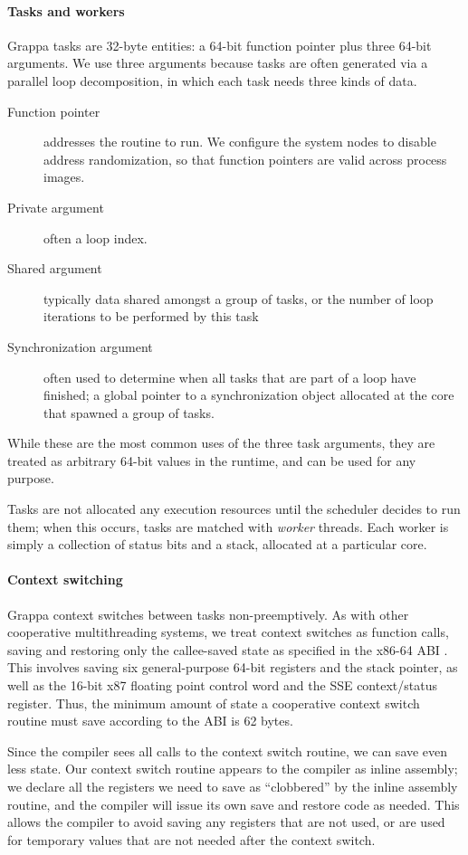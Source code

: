 \paragraph{Tasks and workers} Grappa tasks are 32-byte entities: a
64-bit function pointer plus three 64-bit arguments. We use three
arguments because tasks are often generated via a parallel loop
decomposition, in which each task needs three kinds of data.
\begin{description}
\item[Function pointer] addresses the routine to run. We configure the system nodes to disable address randomization, so that function pointers are valid across process images.
\item[Private argument] often a loop index.
\item[Shared argument] typically data shared amongst a group of tasks, or the number of loop iterations to be performed by this task
\item[Synchronization argument] often used to determine
  when all tasks that are part of a loop have finished; a global pointer to a synchronization object allocated at the core that spawned a group of tasks.
\end{description}
While these are the most common uses of the three task arguments, they
are treated as arbitrary 64-bit values in the runtime, and can be used
for any purpose.

Tasks are not allocated any execution resources until the scheduler
decides to run them; when this occurs, tasks are matched with {\em
  worker} threads. Each worker is simply a collection of status bits and a
stack, allocated at a particular core.

\paragraph{Context switching} Grappa context switches between tasks
non-preemptively. As with other cooperative multithreading systems, we
treat context switches as function calls, saving and restoring only the
callee-saved state as specified in the x86-64 ABI \cite{amd64:abi:2012}. This
involves saving six general-purpose 64-bit registers and the stack
pointer, as well as the 16-bit x87 floating point control word and the
SSE context/status register. Thus, the minimum amount of state a
cooperative context switch routine must save according to the ABI is 62
bytes.

Since the compiler sees all calls to the context switch routine, we
can save even less state. Our context switch routine appears to the
compiler as inline assembly; we declare all the registers we need
to save as ``clobbered'' by the inline assembly routine, and the
compiler will issue its own save and restore code as needed. This allows the
compiler to avoid saving any registers that are not used, or are used
for temporary values that are not needed after the context switch.

